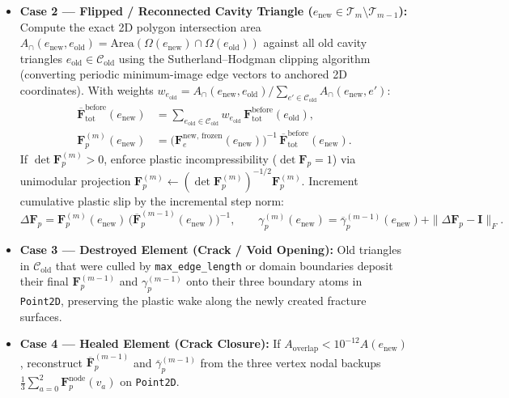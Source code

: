 \documentclass[11pt,a4paper]{article}
\newcommand{\code}[1]{\texttt{#1}}
\begin{document}
\begin{enumerate}[leftmargin=2em]
\begin{itemize}[nosep]
      \item \textbf{Case 2 — Flipped / Reconnected Cavity Triangle ($e_{\text{new}} \in \mathcal{T}_m \setminus \mathcal{T}_{m-1}$):}
        Compute the exact 2D polygon intersection area $A_{\cap}(e_{\text{new}}, e_{\text{old}}) = \mathrm{Area}(\Omega(e_{\text{new}}) \cap \Omega(e_{\text{old}}))$ against all old cavity triangles $e_{\text{old}} \in \mathcal{C}_{\text{old}}$ using the Sutherland--Hodgman clipping algorithm (converting periodic minimum-image edge vectors to anchored 2D coordinates). With weights $w_{e_{\text{old}}} = A_{\cap}(e_{\text{new}}, e_{\text{old}}) / \sum_{e' \in \mathcal{C}_{\text{old}}} A_{\cap}(e_{\text{new}}, e')$:
        \begin{align}
          \overline{\mathbf{F}}_{\text{tot}}^{\text{before}}(e_{\text{new}}) &= \sum_{e_{\text{old}} \in \mathcal{C}_{\text{old}}} w_{e_{\text{old}}} \, \mathbf{F}_{\text{tot}}^{\text{before}}(e_{\text{old}}), \\
          \mathbf{F}_p^{(m)}(e_{\text{new}}) &= \bigl(\mathbf{F}_e^{\text{new, frozen}}(e_{\text{new}})\bigr)^{-1} \, \overline{\mathbf{F}}_{\text{tot}}^{\text{before}}(e_{\text{new}}).
        \end{align}
        If $\det \mathbf{F}_p^{(m)} > 0$, enforce plastic incompressibility ($\det \mathbf{F}_p = 1$) via unimodular projection $\mathbf{F}_p^{(m)} \leftarrow (\det \mathbf{F}_p^{(m)})^{-1/2} \mathbf{F}_p^{(m)}$. Increment cumulative plastic slip by the incremental step norm:
        \begin{equation}
          \Delta\mathbf{F}_p = \mathbf{F}_p^{(m)}(e_{\text{new}}) \, \bigl(\overline{\mathbf{F}}_p^{(m-1)}(e_{\text{new}})\bigr)^{-1}, \qquad
          \gamma_p^{(m)}(e_{\text{new}}) = \overline{\gamma}_p^{(m-1)}(e_{\text{new}}) + \|\Delta\mathbf{F}_p - \mathbf{I}\|_F.
        \end{equation}

      \item \textbf{Case 3 — Destroyed Element (Crack / Void Opening):}
        Old triangles in $\mathcal{C}_{\text{old}}$ that were culled by \code{max\_edge\_length} or domain boundaries deposit their final $\mathbf{F}_p^{(m-1)}$ and $\gamma_p^{(m-1)}$ onto their three boundary atoms in \code{Point2D}, preserving the plastic wake along the newly created fracture surfaces.

      \item \textbf{Case 4 — Healed Element (Crack Closure):}
        If $A_{\text{overlap}} < 10^{-12} A(e_{\text{new}})$, reconstruct $\overline{\mathbf{F}}_p^{(m-1)}$ and $\overline{\gamma}_p^{(m-1)}$ from the three vertex nodal backups $\frac{1}{3}\sum_{a=0}^2 \mathbf{F}_p^{\text{node}}(v_a)$ on \code{Point2D}.
    \end{itemize}
\end{enumerate}
\end{document}
